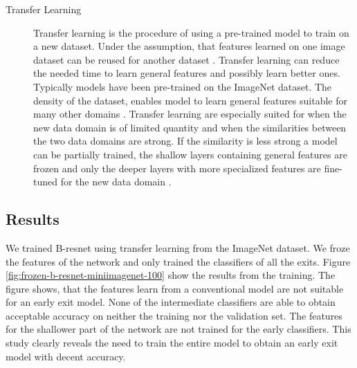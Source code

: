 \begin{description}
	\item[Transfer Learning] Transfer learning is the procedure of using a pre-trained model to train on a new dataset. Under the assumption, that features learned on one image dataset can be reused for another dataset \cite{yosinski_how_2014}. Transfer learning can reduce the needed time to learn general features and possibly learn better ones. Typically models have been pre-trained on the ImageNet dataset. The density of the dataset, enables model to learn general features suitable for many other domains \cite{kornblith_better_2019}. Transfer learning are especially suited for when the new data domain is of limited quantity and when the similarities between the two data domains are strong. If the similarity is less strong a model can be partially trained, the shallow layers containing general features are frozen and only the deeper layers with more specialized features are fine-tuned for the new data domain \cite{li_cs231n:_2018}.
\end{description}

\subsection{Results} \label{sec:training-results}

We trained B-\gls{resnet} using transfer learning from the ImageNet dataset. We froze the features of the network and only trained the classifiers of all the exits. Figure \ref{fig:frozen-b-resnet-miniimagenet-100} show the results from the training. The figure shows, that the features learn from a conventional model are not suitable for an early exit model. None of the intermediate classifiers are able to obtain acceptable accuracy on neither the training nor the validation set. The features for the shallower part of the network are not trained for the early classifiers. This study clearly reveals the need to train the entire model to obtain an early exit model with decent accuracy.  

